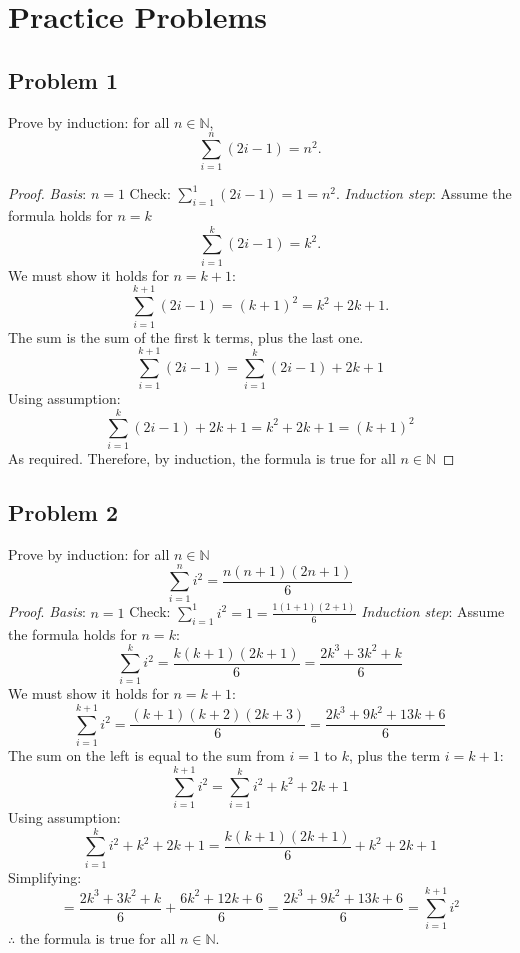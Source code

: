 \documentclass[12pt]{article}
\title{\scalebox{2}{Math 341 Problem Set 1}}
\author{\scalebox{1.5}{Theo Koss}}
\date{September 2019}
\newcommand{\N}{\mathbb{N}}
\begin{document}
\maketitle
\section{Practice Problems}
\subsection*{Problem 1}
Prove by induction: for all $n \in \N$,
$$
\sum_{i=1}^{n}\left(2i-1\right) = n^2.
$$
\begin{proof}
\emph{Basis}: $n=1$ Check: $\sum_{i=1}^{1}\left(2i-1\right)=1=n^2$.
\newline\emph{Induction step}: Assume the formula holds for $n=k$
$$
\sum_{i=1}^{k}\left(2i-1\right) = k^2.
$$
We must show it holds for $n=k+1$:
$$
\sum_{i=1}^{k+1}\left(2i-1\right) = \left(k+1\right)^2=k^2+2k+1.
$$
The sum is the sum of the first k terms, plus the last one.
$$
\sum_{i=1}^{k+1}\left(2i-1\right)=\sum_{i=1}^{k}\left(2i-1\right)+2k+1
$$
Using assumption:
$$
\sum_{i=1}^{k}\left(2i-1\right)+2k+1=k^2+2k+1 = \left(k+1\right)^2
$$
As required. Therefore, by induction, the formula is true for all $n \in \N$
\end{proof}
\subsection*{Problem 2}
Prove by induction: for all $n \in \N$
$$
\sum_{i=1}^{n}i^2=\frac{n\left(n+1\right)\left(2n+1\right)}{6}
$$
\emph{Proof}. \emph{Basis}: $n=1$ Check: $\sum_{i=1}^{1}i^2=1=\frac{1\left(1+1\right)\left(2+1\right)}{6}$
\newline \emph{Induction step}: Assume the formula holds for $n=k$:
$$
\sum_{i=1}^{k}i^2=\frac{k\left(k+1\right)\left(2k+1\right)}{6}=\frac{2k^3+3k^2+k}{6}
$$
We must show it holds for $n=k+1$:
$$
\sum_{i=1}^{k+1}i^2=\frac{\left(k+1\right)\left(k+2\right)\left(2k+3\right)}{6}=\frac{2k^3+9k^2+13k+6}{6}
$$
The sum on the left is equal to the sum from $i=1$ to $k$, plus the term $i=k+1$:
$$
\sum_{i=1}^{k+1}i^2=\sum_{i=1}^{k}i^2+k^2+2k+1
$$
Using assumption:
$$
\sum_{i=1}^{k}i^2+k^2+2k+1=\frac{k\left(k+1\right)\left(2k+1\right)}{6}+k^2+2k+1
$$
Simplifying:
$$
= \frac{2k^3+3k^2+k}{6}+\frac{6k^2+12k+6}{6}=\frac{2k^3+9k^2+13k+6}{6}=\sum_{i=1}^{k+1}i^2
$$
$\therefore$ the formula is true for all $n \in \N$.
\end{document}
